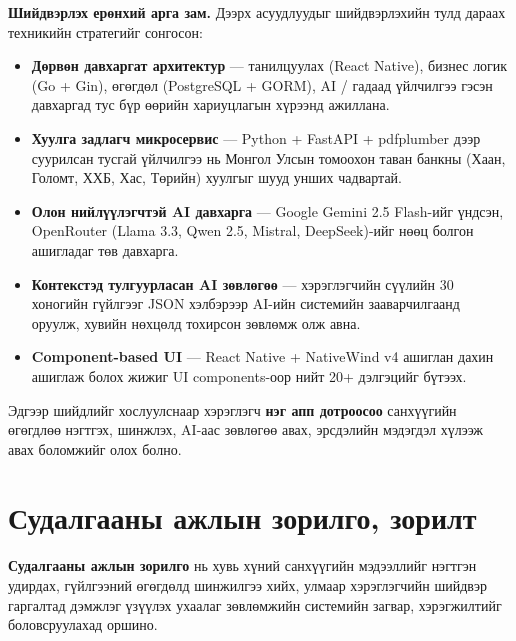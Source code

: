 \textbf{Шийдвэрлэх ерөнхий арга зам.} Дээрх асуудлуудыг шийдвэрлэхийн тулд дараах техникийн стратегийг сонгосон:

\begin{itemize}
    \item [\textbf{1.}] \textbf{Дөрвөн давхаргат архитектур} --- танилцуулах (React Native), бизнес логик (Go + Gin), өгөгдөл (PostgreSQL + GORM), AI / гадаад үйлчилгээ гэсэн давхаргад тус бүр өөрийн хариуцлагын хүрээнд ажиллана.

    \item [\textbf{2.}] \textbf{Хуулга задлагч микросервис} --- Python + FastAPI + pdfplumber дээр суурилсан тусгай үйлчилгээ нь Монгол Улсын томоохон таван банкны (Хаан, Голомт, ХХБ, Хас, Төрийн) хуулгыг шууд унших чадвартай.

    \item [\textbf{3.}] \textbf{Олон нийлүүлэгчтэй AI давхарга} --- Google Gemini 2.5 Flash-ийг үндсэн, OpenRouter (Llama 3.3, Qwen 2.5, Mistral, DeepSeek)-ийг нөөц болгон ашигладаг төв давхарга.

    \item [\textbf{4.}] \textbf{Контекстэд тулгуурласан AI зөвлөгөө} --- хэрэглэгчийн сүүлийн 30 хоногийн гүйлгээг JSON хэлбэрээр AI-ийн системийн зааварчилгаанд оруулж, хувийн нөхцөлд тохирсон зөвлөмж олж авна.

    \item [\textbf{5.}] \textbf{Component-based UI} --- React Native + NativeWind v4 ашиглан дахин ашиглаж болох жижиг UI components-оор нийт 20+ дэлгэцийг бүтээх.
\end{itemize}

Эдгээр шийдлийг хослуулснаар хэрэглэгч \textbf{нэг апп дотроосоо} санхүүгийн өгөгдлөө нэгтгэх, шинжлэх, AI-аас зөвлөгөө авах, эрсдэлийн мэдэгдэл хүлээж авах боломжийг олох болно.

\section{Судалгааны ажлын зорилго, зорилт}
\textbf{Судалгааны ажлын зорилго} нь хувь хүний санхүүгийн мэдээллийг нэгтгэн удирдах, гүйлгээний өгөгдөлд шинжилгээ хийх, улмаар хэрэглэгчийн шийдвэр гаргалтад дэмжлэг үзүүлэх ухаалаг зөвлөмжийн системийн загвар, хэрэгжилтийг боловсруулахад оршино.\\

